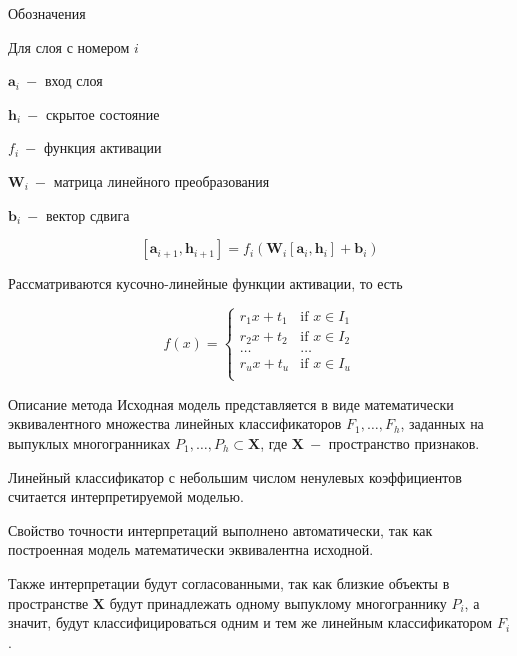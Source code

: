 \documentclass{beamer}
\begin{document}
\begin{frame}{Обозначения}

Для слоя с номером $i$

$\mathbf{a}_i~-$ вход слоя

$\mathbf{h}_i~-$ скрытое состояние

$f_i~-$ функция активации

$\mathbf{W}_i~-$ матрица линейного преобразования

$\mathbf{b}_i~-$ вектор сдвига

$$[\mathbf{a}_{i+1}, \mathbf{h}_{i+1}]=f_i\left(\mathbf{W}_i [\mathbf{a}_{i},\mathbf{h}_i] + \mathbf{b}_i\right)$$

Рассматриваются кусочно-линейные функции активации, то есть

\[f(x)=\left\{
\begin{array}{ll}
      r_1 x+t_1 & \text{if } x\in I_1 \\
      r_2 x+t_2 & \text{if } x\in I_2 \\
      \dots&\dots\\
      r_u x+t_u & \text{if } x\in I_u \\
\end{array} 
\right. \]
\end{frame}
\begin{frame}{Описание метода}
Исходная модель представляется в виде математически эквивалентного множества линейных классификаторов $F_1,\dots,F_h$, заданных на выпуклых многогранниках $P_1,\dots,P_h\subset \mathbf{X}$, где $\mathbf{X}~-$ пространство признаков.
\bigskip

Линейный классификатор с небольшим числом ненулевых коэффициентов считается интерпретируемой моделью.
\bigskip

Свойство точности интерпретаций выполнено автоматически, так как построенная модель математически эквивалентна исходной.
\bigskip

Также интерпретации будут согласованными, так как близкие объекты в пространстве $\mathbf{X}$ будут принадлежать одному выпуклому многограннику $P_i$, а значит, будут классифицироваться одним и тем же линейным классификатором $F_i$.

\end{frame}
\end{document}
